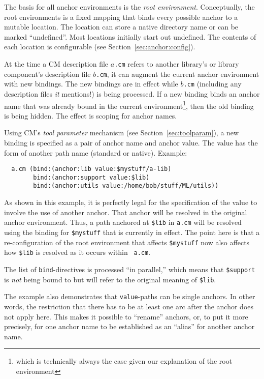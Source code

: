 \documentclass[titlepage,letterpaper]{article}
\begin{document}
The basis for all anchor environments is the {\em root environment}.
Conceptually, the root environments is a fixed mapping that binds
every possible anchor to a mutable location.  The location can store a
native directory name or can be marked ``undefined''.  Most locations
initially start out undefined.  The contents of each location is
configurable (see Section~\ref{sec:anchor:config}).

At the time a CM description file $a${\tt .cm} refers to another
library's or library component's description file $b${\tt .cm}, it can
augment the current anchor environment with new bindings.  The new
bindings are in effect while $b${\tt .cm} (including any description
files {\it it}\/ mentions!) is being processed.  If a new binding
binds an anchor name that was already bound in the current
environment\footnote{which is technically always the case given our
explanation of the root environment}, then the old binding is being
hidden.  The effect is scoping for anchor names.

Using CM's {\em tool parameter} mechanism (see
Section~\ref{sec:toolparam}), a new binding is specified as a pair of
anchor name and anchor value.  The value has the form of another path
name (standard or native). Example:

\begin{verbatim}
  a.cm (bind:(anchor:lib value:$mystuff/a-lib)
        bind:(anchor:support value:$lib)
        bind:(anchor:utils value:/home/bob/stuff/ML/utils))
\end{verbatim}

As shown in this example, it is perfectly legal for the specification
of the value to involve the use of another anchor.  That anchor will
be resolved in the original anchor environment. Thus, a path anchored
at {\tt \$lib} in {\tt a.cm} will be resolved using the binding for
{\tt \$mystuff} that is currently in effect.  The point here is that a
re-configuration of the root environment that affects {\tt \$mystuff}
now also affects how {\tt \$lib} is resolved as it occurs within {\tt
a.cm}.

The list of {\tt bind}-directives is processed ``in parallel,'' which
means that {\tt \$support} is {\em not} being bound to but will refer to the original meaning of
{\tt \$lib}.

The example also demonstrates that {\tt value}-paths can be single
anchors. In other words, the restriction that there has to be at least
one arc after the anchor does not apply here. This makes it possible
to ``rename'' anchors, or, to put it more precisely, for one anchor
name to be established as an ``alias'' for another anchor name.
\end{document}
